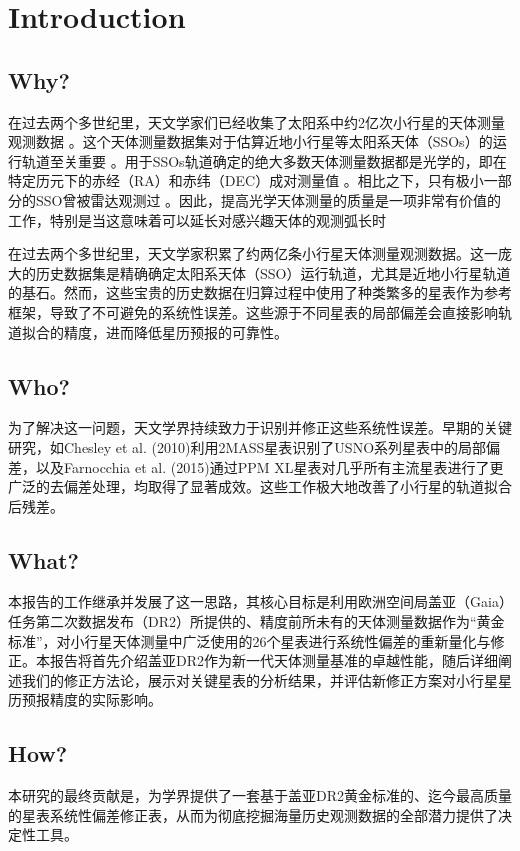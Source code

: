 \section{Introduction}
\subsection{Why?}

在过去两个多世纪里，天文学家们已经收集了太阳系中约2亿次小行星的天体测量观测数据 。这个天体测量数据集对于估算近地小行星等太阳系天体（SSOs）的运行轨道至关重要 。用于SSOs轨道确定的绝大多数天体测量数据都是光学的，即在特定历元下的赤经（RA）和赤纬（DEC）成对测量值 。相比之下，只有极小一部分的SSO曾被雷达观测过 。因此，提高光学天体测量的质量是一项非常有价值的工作，特别是当这意味着可以延长对感兴趣天体的观测弧长时 

在过去两个多世纪里，天文学家积累了约两亿条小行星天体测量观测数据。这一庞大的历史数据集是精确确定太阳系天体（SSO）运行轨道，尤其是近地小行星轨道的基石。然而，这些宝贵的历史数据在归算过程中使用了种类繁多的星表作为参考框架，导致了不可避免的系统性误差。这些源于不同星表的局部偏差会直接影响轨道拟合的精度，进而降低星历预报的可靠性。

\subsection{Who?}
为了解决这一问题，天文学界持续致力于识别并修正这些系统性误差。早期的关键研究，如Chesley et al. (2010)利用2MASS星表识别了USNO系列星表中的局部偏差，以及Farnocchia et al. (2015)通过PPM XL星表对几乎所有主流星表进行了更广泛的去偏差处理，均取得了显著成效。这些工作极大地改善了小行星的轨道拟合后残差。

\subsection{What?}
本报告的工作继承并发展了这一思路，其核心目标是利用欧洲空间局盖亚（Gaia）任务第二次数据发布（DR2）所提供的、精度前所未有的天体测量数据作为“黄金标准”，对小行星天体测量中广泛使用的26个星表进行系统性偏差的重新量化与修正。本报告将首先介绍盖亚DR2作为新一代天体测量基准的卓越性能，随后详细阐述我们的修正方法论，展示对关键星表的分析结果，并评估新修正方案对小行星星历预报精度的实际影响。

\subsection{How?}
本研究的最终贡献是，为学界提供了一套基于盖亚DR2黄金标准的、迄今最高质量的星表系统性偏差修正表，从而为彻底挖掘海量历史观测数据的全部潜力提供了决定性工具。
\newpage